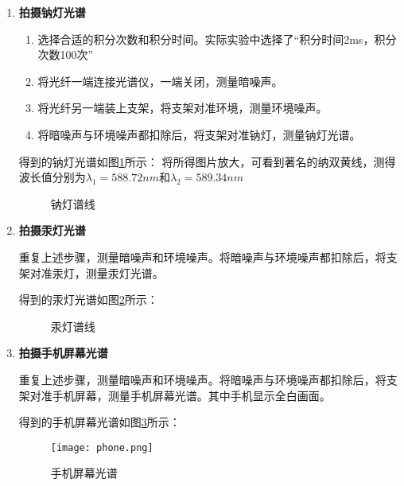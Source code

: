 \documentclass[dvipsnames, svgnames,a4paper,11pt]{article}
\begin{document}
		\begin{enumerate}
			\item \textbf{拍摄钠灯光谱}
				\begin{enumerate}
					\item 选择合适的积分次数和积分时间。实际实验中选择了“积分时间2ms，积分次数100次”
					
					\item 将光纤一端连接光谱仪，一端关闭，测量暗噪声。 
					
					\item 将光纤另一端装上支架，将支架对准环境，测量环境噪声。
					
					\item 将暗噪声与环境噪声都扣除后，将支架对准钠灯，测量钠灯光谱。
					
				\end{enumerate}
				
				得到的钠灯光谱如图\ref{fig:Na-1}所示：
				将所得图片放大，可看到著名的纳双黄线，测得波长值分别为$\lambda_1=588.72nm$和$\lambda_2=589.34nm$
				
				\begin{figure}[htbp]
					\centering
					\caption{钠灯谱线}
					\label{fig:Na-1}			
				\end{figure}
				
				
				
			\item \textbf{拍摄汞灯光谱}
			
				重复上述步骤，测量暗噪声和环境噪声。将暗噪声与环境噪声都扣除后，将支架对准汞灯，测量汞灯光谱。
				
				
				得到的汞灯光谱如图\ref{fig:Hg-1}所示：
				
				\begin{figure}[htbp]
					\centering
					\caption{汞灯谱线}
					\label{fig:Hg-1}			
				\end{figure}
				
				
			\item \textbf{拍摄手机屏幕光谱}
			
				重复上述步骤，测量暗噪声和环境噪声。将暗噪声与环境噪声都扣除后，将支架对准手机屏幕，测量手机屏幕光谱。其中手机显示全白画面。
				
				得到的手机屏幕光谱如图\ref{fig:phone}所示：
				
				\begin{figure}[htbp]
					\centering
					\texttt{[image: phone.png]}
					\caption{手机屏幕光谱}
					\label{fig:phone}
				\end{figure}
		\end{enumerate}
		
\end{document}
